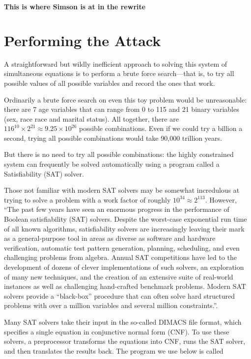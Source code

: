 \documentclass[runningheads]{llncs}
\begin{document}
\textbf{This is where Simson is at in the rewrite}
\section{Performing the Attack}
A straightforward but wildly inefficient approach to solving this
system of simultaneous equations is to perform a brute force
search---that is, to try all possible values of all possible variables
and record the ones that work.

Ordinarily a brute force search on even this toy problem would be
unreasonable: there are 7 age variables that can range from 0 to 115
and 21 binary variables (sex, race race and marital status). All
together, there are $116^{10} \times 2^{21} \approx 9.25
\times 10^{26}$ possible combinations. Even if we could try a billion
a second, trying all possible combinations would take 90,000 trillion
years. 

But there is no need to try all possible combinations: the highly
constrained system can frequently be solved automatically using a
program called a Satisfiability (SAT) solver. 

Those not familiar with modern SAT solvers may be somewhat
incredulous at trying to  solve
a problem with a work factor of roughly $10^{34}\approx2^{113}$.
However, ``The past few years have seen an enormous progress in the performance
of Boolean satisfiability (SAT) solvers. Despite the worst-case
exponential run time of all known algorithms, satisfiability solvers
are increasingly leaving their mark as a general-purpose tool in areas
as diverse as software and hardware verification,
automatic test pattern generation, planning,
scheduling, and even challenging problems from algebra. Annual SAT
competitions have led to the development of dozens
of clever implementations of such solvers, an exploration of many new
techniques, and the creation of an extensive suite of real-world
instances as well as challenging hand-crafted benchmark
problems. Modern SAT solvers provide a ``black-box'' procedure that
can often solve hard structured problems with over a million variables and
several million constraints.''\cite[references omitted]{Gomes200889}.

Many SAT solvers take their input in the so-called DIMACS file format,
which specifies a single equation in conjunctive normal form (CNF). To use these solvers, a
preprocessor transforms the equations into CNF, runs the SAT solver,
and then translates the results back. The program we use below is
called 
\end{document}

